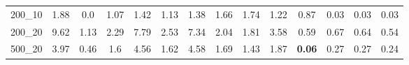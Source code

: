 \begin{tabular}{c|ccccccccccccc}
200\_10      & 1.88         & 0.0          & 1.07         & 1.42         & 1.13         & 1.38         & 1.66         & 1.74         & 1.22         & 0.87         & 0.03         & 0.03         & 0.03         \\ 
200\_20      & 9.62         & 1.13         & 2.29         & 7.79         & 2.53         & 7.34         & 2.04         & 1.81         & 3.58         & 0.59         & 0.67         & 0.64         & 0.54         \\ 
500\_20      & 3.97         & 0.46         & 1.6          & 4.56         & 1.62         & 4.58         & 1.69         & 1.43         & 1.87         & {\bf 0.06}   & 0.27         & 0.27         & 0.24         \\ 
\end{tabular}